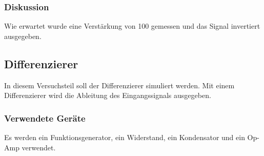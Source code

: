 \documentclass[12pt,a4paper]{article}
\begin{document}
\subsubsection{Diskussion}

Wie erwartet wurde eine Verstärkung von 100 gemessen und das Signal invertiert ausgegeben.


\subsection{Differenzierer}

In diesem Versuchsteil soll der Differenzierer simuliert werden. Mit einem Differenzierer wird die Ableitung des Eingangssignals ausgegeben.

\subsubsection{Verwendete Geräte}

Es werden ein Funktionsgenerator, ein Widerstand, ein Kondensator und ein Op-Amp verwendet.
\end{document}

